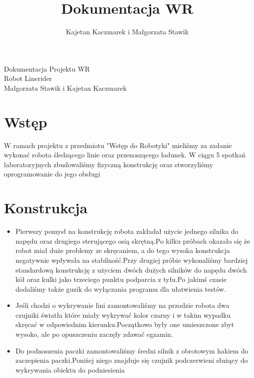 \documentclass[10pt,a4paper]{report}
\author{Kajetan Kaczmarek i Małgorzata Stawik}
\title{Dokumentacja WR}
\begin{document}
\begin{center}\begin{LARGE}
Dokumentacja Projektu WR \\
Robot Linerider\\
Małgorzata Stawik i Kajetan Kaczmarek
\end{LARGE}
\end{center}
\section{Wstęp}
W ramach projektu z przedmiotu "Wstęp do Robotyki" mieliśmy za zadanie wykonać robota śledzącego linie oraz przenoszącego ładunek. W ciągu 5 spotkań laboratoryjnych zbudowaliśmy fizyczną konstrukcję oraz stworzyliśmy oprogramowanie do jego obsługi
\section{Konstrukcja}
\begin{itemize}
\item
Pierwszy pomysł na konstrukcję robota zakładał użycie jednego silnika do napędu oraz drugiego sterującego osią skrętną.Po kilku próbach okazało się że robot miał duże problemy ze skręcaniem, a do tego wysoka konstrukcja negatywnie wpływała na stabilność.Przy drugiej próbie wykonaliśmy bardziej standardową konstrukcję z użyciem dwóch dużych silników do napędu dwóch kół oraz kulki jako trzeciego punktu podparcia z tyłu.Po jakimś czasie dodaliśmy także guzik do wyłączania programu dla ułatwienia testów.
\item
Jeśli chodzi o wykrywanie lini zamontowaliśmy na przodzie robota dwa czujniki światła które miały wykrywać kolor czarny i w takim wypadku skręcać w odpowiednim kierunku.Początkowo były one umieszczone zbyt wysoko, ale po opuszczeniu zaczęły zdawać egzamin.
\item
Do podnoszenia paczki zamontowaliśmy średni silnik z obrotowym hakiem do zaczepienia paczki.Poniżej niego znajduje się czujnik podczerwieni służący do wykrywania obiektu do podniesienia
\end{itemize}
\end{document}
